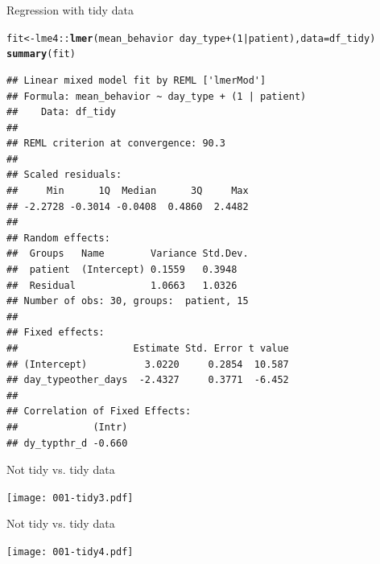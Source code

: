 \documentclass[10pt,handout]{beamer}\usepackage[]{graphicx}\usepackage[]{color}
\makeatletter
\newcommand{\hlnum}[1]{\textcolor[rgb]{0.686,0.059,0.569}{#1}}%
\newcommand{\hlopt}[1]{\textcolor[rgb]{0,0,0}{#1}}%
\newcommand{\hlstd}[1]{\textcolor[rgb]{0.345,0.345,0.345}{#1}}%
\newcommand{\hlkwb}[1]{\textcolor[rgb]{0.69,0.353,0.396}{#1}}%
\newcommand{\hlkwc}[1]{\textcolor[rgb]{0.333,0.667,0.333}{#1}}%
\newcommand{\hlkwd}[1]{\textcolor[rgb]{0.737,0.353,0.396}{\textbf{#1}}}%
\newenvironment{kframe}{%
 \def\at@end@of@kframe{}%
 \ifinner\ifhmode%
  \def\at@end@of@kframe{\end{minipage}}%
  \begin{minipage}{\columnwidth}%
 \fi\fi%
 \def\FrameCommand##1{\hskip\@totalleftmargin \hskip-\fboxsep
 \colorbox{shadecolor}{##1}\hskip-\fboxsep
     \hskip-\linewidth \hskip-\@totalleftmargin \hskip\columnwidth}%
 \MakeFramed {\advance\hsize-\width
   \@totalleftmargin\z@ \linewidth\hsize
   \@setminipage}}%
 {\par\unskip\endMakeFramed%
 \at@end@of@kframe}
\newenvironment{knitrout}{}{} %
\makeatother
\begin{document}
\begin{frame}[fragile]{Regression with tidy data}
	
	
\begin{knitrout}\tiny
{}\color{fgcolor}\begin{kframe}
\begin{alltt}
\hlstd{fit} \hlkwb{<-} \hlstd{lme4}\hlopt{::}\hlkwd{lmer}\hlstd{(mean_behavior} \hlopt{~} \hlstd{day_type} \hlopt{+} \hlstd{(}\hlnum{1}\hlopt{|}\hlstd{patient),} \hlkwc{data} \hlstd{= df_tidy)}
\hlkwd{summary}\hlstd{(fit)}
\end{alltt}
\begin{verbatim}
## Linear mixed model fit by REML ['lmerMod']
## Formula: mean_behavior ~ day_type + (1 | patient)
##    Data: df_tidy
## 
## REML criterion at convergence: 90.3
## 
## Scaled residuals: 
##     Min      1Q  Median      3Q     Max 
## -2.2728 -0.3014 -0.0408  0.4860  2.4482 
## 
## Random effects:
##  Groups   Name        Variance Std.Dev.
##  patient  (Intercept) 0.1559   0.3948  
##  Residual             1.0663   1.0326  
## Number of obs: 30, groups:  patient, 15
## 
## Fixed effects:
##                    Estimate Std. Error t value
## (Intercept)          3.0220     0.2854  10.587
## day_typeother_days  -2.4327     0.3771  -6.452
## 
## Correlation of Fixed Effects:
##             (Intr)
## dy_typthr_d -0.660
\end{verbatim}
\end{kframe}
\end{knitrout}
\end{frame}



\begin{frame}[fragile]{Not tidy vs. tidy data}
	
	
	
	\texttt{[image: 001-tidy3.pdf]}
	
	
	
\end{frame}

\begin{frame}[fragile]{Not tidy vs. tidy data}
	
	
	
	\texttt{[image: 001-tidy4.pdf]}
	
	
	
\end{frame}
\end{document}
